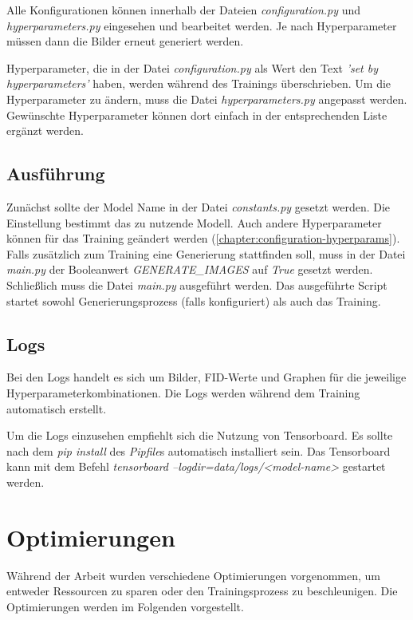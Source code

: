 Alle Konfigurationen können innerhalb der Dateien \textit{configuration.py} und \textit{hyperparameters.py} eingesehen und bearbeitet werden.
Je nach Hyperparameter müssen dann die Bilder erneut generiert werden.
\newline

Hyperparameter, die in der Datei \textit{configuration.py} als Wert den Text \textit{'set by hyperparameters'} haben, werden während des Trainings überschrieben.
Um die Hyperparameter zu ändern, muss die Datei \textit{hyperparameters.py} angepasst werden.
Gewünschte Hyperparameter können dort einfach in der entsprechenden Liste ergänzt werden.

\subsection{Ausführung}
Zunächst sollte der Model Name in der Datei \textit{constants.py} gesetzt werden.
Die Einstellung bestimmt das zu nutzende Modell.
Auch andere Hyperparameter können für das Training geändert werden (\cref{chapter:configuration-hyperparams}).
Falls zusätzlich zum Training eine Generierung stattfinden soll, muss in der Datei \textit{main.py} der Booleanwert \textit{GENERATE\_IMAGES} auf \textit{True} gesetzt werden.
Schließlich muss die Datei \textit{main.py} ausgeführt werden.
Das ausgeführte Script startet sowohl Generierungsprozess (falls konfiguriert) als auch das Training.

\subsection{Logs}
Bei den Logs handelt es sich um Bilder, FID-Werte und Graphen für die jeweilige Hyperparameterkombinationen.
Die Logs werden während dem Training automatisch erstellt.

Um die Logs einzusehen empfiehlt sich die Nutzung von Tensorboard.
Es sollte nach dem \textit{pip install} des \textit{Pipfile}s automatisch installiert sein.
Das Tensorboard kann mit dem Befehl \textit{tensorboard --logdir=data/logs/<model-name>} gestartet werden.

\section{Optimierungen}
Während der Arbeit wurden verschiedene Optimierungen vorgenommen, um entweder Ressourcen zu sparen oder den Trainingsprozess zu beschleunigen.
Die Optimierungen werden im Folgenden vorgestellt.


